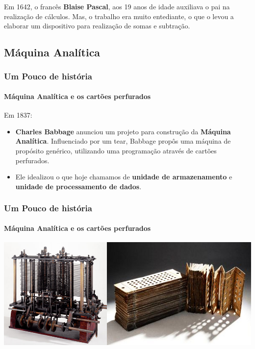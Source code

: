 \documentclass[12pt,a4paper,final]{beamer}
\begin{document}
\begin{frame}
\begin{minipage}{.3\linewidth}
                \end{minipage}           
                \begin{minipage}{.6\linewidth}
Em 1642, o francês \textbf{Blaise Pascal}, aos 19 anos de idade auxiliava o pai na realização de cálculos. Mas, o trabalho era muito entediante, o que o levou a elaborar um dispositivo para realização de somas e subtração.  
                \end{minipage}
            \end{frame}
        \subsection{Máquina Analítica}
            \begin{frame}
                \frametitle{Um Pouco de história}
                \framesubtitle{Máquina Analítica e os cartões perfurados}
                \begin{block}{Em 1837:}
                \begin{itemize}
                    \item \textbf{Charles Babbage} anunciou um projeto para construção da \textbf{Máquina Analítica}. Influenciado por um tear, Babbage propôs uma máquina de propósito genérico, utilizando uma programação através de cartões perfurados.
                    \item Ele idealizou o que hoje chamamos de \textbf{unidade de armazenamento} e \textbf{unidade de processamento de dados}.
                \end{itemize}
                \end{block}
            \end{frame}
            \begin{frame}
                \frametitle{Um Pouco de história}
                \framesubtitle{Máquina Analítica e os cartões perfurados}
                \begin{block}{}
                     \centering
                     \includegraphics[scale=.34]{Imagens/analitica.png}
                \end{block}
            \end{frame}
\end{document}
